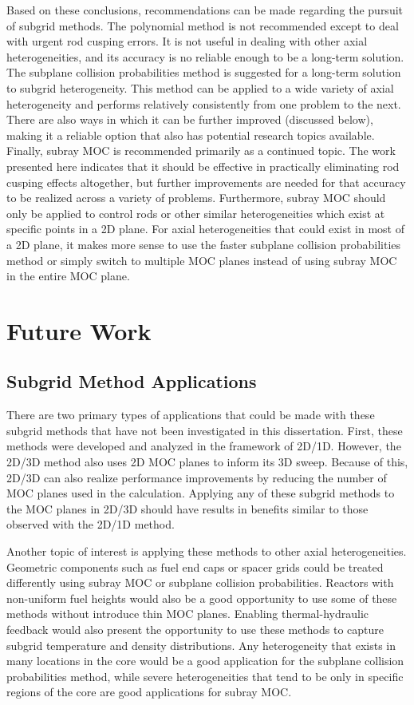 Based on these conclusions, recommendations can be made regarding the pursuit of subgrid methods.  The polynomial method is not recommended except to deal with urgent rod cusping errors.  It is not useful in dealing with other axial heterogeneities, and its accuracy is no reliable enough to be a long-term solution.  The subplane collision probabilities method is suggested for a long-term solution to subgrid heterogeneity.  This method can be applied to a wide variety of axial heterogeneity and performs relatively consistently from one problem to the next.  There are also ways in which it can be further improved (discussed below), making it a reliable option that also has potential research topics available.  Finally, subray MOC is recommended primarily as a continued topic.  The work presented here indicates that it should be effective in practically eliminating rod cusping effects altogether, but further improvements are needed for that accuracy to be realized across a variety of problems.  Furthermore, subray MOC should only be applied to control rods or other similar heterogeneities which exist at specific points in a 2D plane.  For axial heterogeneities that could exist in most of a 2D plane, it makes more sense to use the faster subplane collision probabilities method or simply switch to multiple MOC planes instead of using subray MOC in the entire MOC plane.

\section{Future Work}

\subsection{Subgrid Method Applications}

There are two primary types of applications that could be made with these subgrid methods that have not been investigated in this dissertation. First, these methods were developed and analyzed in the framework of 2D/1D.  However, the 2D/3D method also uses 2D MOC planes to inform its 3D sweep.  Because of this, 2D/3D can also realize performance improvements by reducing the number of MOC planes used in the calculation.  Applying any of these subgrid methods to the MOC planes in 2D/3D should have results in benefits similar to those observed with the 2D/1D method.

Another topic of interest is applying these methods to other axial heterogeneities.  Geometric components such as fuel end caps or spacer grids could be treated differently using subray MOC or subplane collision probabilities.  Reactors with non-uniform fuel heights would also be a good opportunity to use some of these methods without introduce thin MOC planes.  Enabling thermal-hydraulic feedback would also present the opportunity to use these methods to capture subgrid temperature and density distributions.  Any heterogeneity that exists in many locations in the core would be a good application for the subplane collision probabilities method, while severe heterogeneities that tend to be only in specific regions of the core are good applications for subray MOC.

